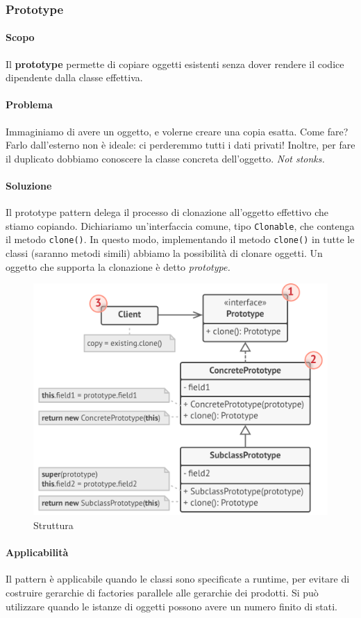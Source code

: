 \documentclass[11pt]{article}
\newcommand{\code}[1]{\texttt{#1}}
\begin{document}
\subsubsection{Prototype}
\paragraph{Scopo}
Il \textbf{prototype} permette di copiare oggetti esistenti senza dover rendere il codice dipendente dalla classe effettiva.
\paragraph{Problema}
Immaginiamo di avere un oggetto, e volerne creare una copia esatta. Come fare? Farlo dall'esterno non è ideale: ci perderemmo tutti i dati privati! Inoltre, per fare il duplicato dobbiamo conoscere la classe concreta dell'oggetto. \textit{Not stonks.}
\paragraph{Soluzione}
Il prototype pattern delega il processo di clonazione all'oggetto effettivo che stiamo copiando. Dichiariamo un'interfaccia comune, tipo \code{Clonable}, che contenga il metodo \code{clone()}. In questo modo, implementando il metodo \code{clone()} in tutte le classi (saranno metodi simili) abbiamo la possibilità di clonare oggetti. Un oggetto che supporta la clonazione è detto \textit{prototype.}
\begin{figure}[H]
    \centering
    \includegraphics[width=0.7\linewidth]{res/teoria/Prototype.png}
    \caption{Struttura}
\end{figure}
\paragraph{Applicabilità}
Il pattern è applicabile quando le classi sono specificate a runtime, per evitare di costruire gerarchie di factories parallele alle gerarchie dei prodotti. Si può utilizzare quando le istanze di oggetti possono avere un numero finito di stati.
\end{document}
